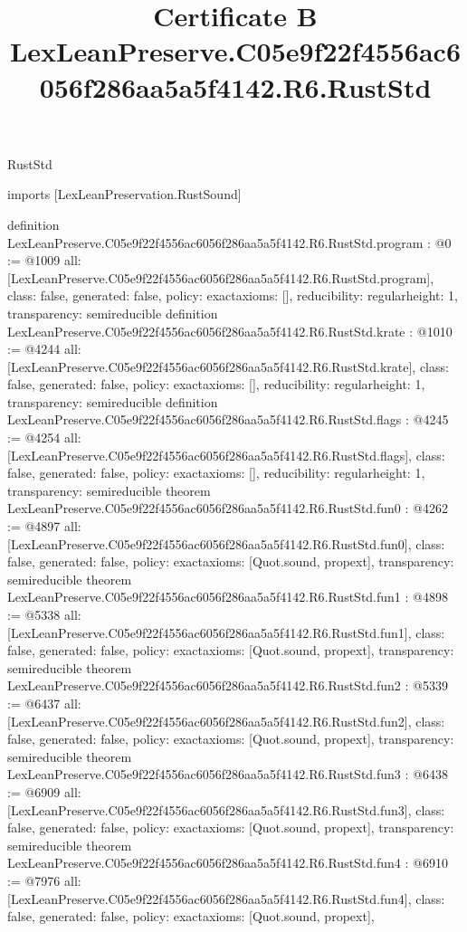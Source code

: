 \begin{lexlean}{RustStd}
\title{Certificate B LexLeanPreserve.C05e9f22f4556ac6056f286aa5a5f4142.R6.RustStd}
\begin{coremodule}
imports [LexLeanPreservation.RustSound]

definition LexLeanPreserve.C05e9f22f4556ac6056f286aa5a5f4142.R6.RustStd.program : @0 := @1009 {
  all: [LexLeanPreserve.C05e9f22f4556ac6056f286aa5a5f4142.R6.RustStd.program],
  class: false,
  generated: false,
  policy: exact{axioms: []},
  reducibility: regular{height: 1},
  transparency: semireducible
}
definition LexLeanPreserve.C05e9f22f4556ac6056f286aa5a5f4142.R6.RustStd.krate : @1010 := @4244 {
  all: [LexLeanPreserve.C05e9f22f4556ac6056f286aa5a5f4142.R6.RustStd.krate],
  class: false,
  generated: false,
  policy: exact{axioms: []},
  reducibility: regular{height: 1},
  transparency: semireducible
}
definition LexLeanPreserve.C05e9f22f4556ac6056f286aa5a5f4142.R6.RustStd.flags : @4245 := @4254 {
  all: [LexLeanPreserve.C05e9f22f4556ac6056f286aa5a5f4142.R6.RustStd.flags],
  class: false,
  generated: false,
  policy: exact{axioms: []},
  reducibility: regular{height: 1},
  transparency: semireducible
}
theorem LexLeanPreserve.C05e9f22f4556ac6056f286aa5a5f4142.R6.RustStd.fun0 : @4262 := @4897 {
  all: [LexLeanPreserve.C05e9f22f4556ac6056f286aa5a5f4142.R6.RustStd.fun0],
  class: false,
  generated: false,
  policy: exact{axioms: [Quot.sound, propext]},
  transparency: semireducible
}
theorem LexLeanPreserve.C05e9f22f4556ac6056f286aa5a5f4142.R6.RustStd.fun1 : @4898 := @5338 {
  all: [LexLeanPreserve.C05e9f22f4556ac6056f286aa5a5f4142.R6.RustStd.fun1],
  class: false,
  generated: false,
  policy: exact{axioms: [Quot.sound, propext]},
  transparency: semireducible
}
theorem LexLeanPreserve.C05e9f22f4556ac6056f286aa5a5f4142.R6.RustStd.fun2 : @5339 := @6437 {
  all: [LexLeanPreserve.C05e9f22f4556ac6056f286aa5a5f4142.R6.RustStd.fun2],
  class: false,
  generated: false,
  policy: exact{axioms: [Quot.sound, propext]},
  transparency: semireducible
}
theorem LexLeanPreserve.C05e9f22f4556ac6056f286aa5a5f4142.R6.RustStd.fun3 : @6438 := @6909 {
  all: [LexLeanPreserve.C05e9f22f4556ac6056f286aa5a5f4142.R6.RustStd.fun3],
  class: false,
  generated: false,
  policy: exact{axioms: [Quot.sound, propext]},
  transparency: semireducible
}
theorem LexLeanPreserve.C05e9f22f4556ac6056f286aa5a5f4142.R6.RustStd.fun4 : @6910 := @7976 {
  all: [LexLeanPreserve.C05e9f22f4556ac6056f286aa5a5f4142.R6.RustStd.fun4],
  class: false,
  generated: false,
  policy: exact{axioms: [Quot.sound, propext]},
}
\end{coremodule}
\end{lexlean}
